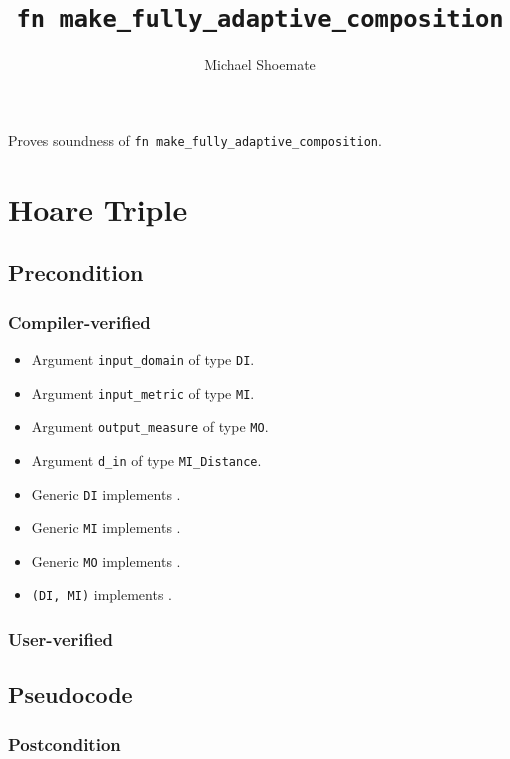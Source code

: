 \documentclass{article}
\title{\texttt{fn make\_fully\_adaptive\_composition}}
\author{Michael Shoemate}
\date{}
\begin{document}
\maketitle

\contrib
Proves soundness of \texttt{fn make\_fully\_adaptive\_composition}.

\section{Hoare Triple}
\subsection*{Precondition}
\subsubsection*{Compiler-verified}
\begin{itemize}
    \item Argument \texttt{input\_domain} of type \texttt{DI}.
    \item Argument \texttt{input\_metric} of type \texttt{MI}.
    \item Argument \texttt{output\_measure} of type \texttt{MO}.
    \item Argument \texttt{d\_in} of type \texttt{MI\_Distance}.
    \item Generic \texttt{DI} implements .
    \item Generic \texttt{MI} implements .
    \item Generic \texttt{MO} implements .
    \item \texttt{(DI, MI)} implements .
\end{itemize}
\subsubsection*{User-verified}


\subsection*{Pseudocode}


\subsubsection*{Postcondition}
\end{document}
